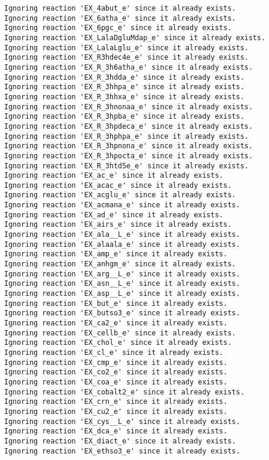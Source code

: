 \documentclass[
  letterpaper,
  DIV=11,
  numbers=noendperiod]{scrartcl}
\begin{document}
\begin{verbatim}
Ignoring reaction 'EX_4abut_e' since it already exists.
Ignoring reaction 'EX_6atha_e' since it already exists.
Ignoring reaction 'EX_6pgc_e' since it already exists.
Ignoring reaction 'EX_LalaDgluMdap_e' since it already exists.
Ignoring reaction 'EX_LalaLglu_e' since it already exists.
Ignoring reaction 'EX_R3hdec4e_e' since it already exists.
Ignoring reaction 'EX_R_3h6atha_e' since it already exists.
Ignoring reaction 'EX_R_3hdda_e' since it already exists.
Ignoring reaction 'EX_R_3hhpa_e' since it already exists.
Ignoring reaction 'EX_R_3hhxa_e' since it already exists.
Ignoring reaction 'EX_R_3hnonaa_e' since it already exists.
Ignoring reaction 'EX_R_3hpba_e' since it already exists.
Ignoring reaction 'EX_R_3hpdeca_e' since it already exists.
Ignoring reaction 'EX_R_3hphpa_e' since it already exists.
Ignoring reaction 'EX_R_3hpnona_e' since it already exists.
Ignoring reaction 'EX_R_3hpocta_e' since it already exists.
Ignoring reaction 'EX_R_3htd5e_e' since it already exists.
Ignoring reaction 'EX_ac_e' since it already exists.
Ignoring reaction 'EX_acac_e' since it already exists.
Ignoring reaction 'EX_acglu_e' since it already exists.
Ignoring reaction 'EX_acmana_e' since it already exists.
Ignoring reaction 'EX_ad_e' since it already exists.
Ignoring reaction 'EX_airs_e' since it already exists.
Ignoring reaction 'EX_ala__L_e' since it already exists.
Ignoring reaction 'EX_alaala_e' since it already exists.
Ignoring reaction 'EX_amp_e' since it already exists.
Ignoring reaction 'EX_anhgm_e' since it already exists.
Ignoring reaction 'EX_arg__L_e' since it already exists.
Ignoring reaction 'EX_asn__L_e' since it already exists.
Ignoring reaction 'EX_asp__L_e' since it already exists.
Ignoring reaction 'EX_but_e' since it already exists.
Ignoring reaction 'EX_butso3_e' since it already exists.
Ignoring reaction 'EX_ca2_e' since it already exists.
Ignoring reaction 'EX_cellb_e' since it already exists.
Ignoring reaction 'EX_chol_e' since it already exists.
Ignoring reaction 'EX_cl_e' since it already exists.
Ignoring reaction 'EX_cmp_e' since it already exists.
Ignoring reaction 'EX_co2_e' since it already exists.
Ignoring reaction 'EX_coa_e' since it already exists.
Ignoring reaction 'EX_cobalt2_e' since it already exists.
Ignoring reaction 'EX_crn_e' since it already exists.
Ignoring reaction 'EX_cu2_e' since it already exists.
Ignoring reaction 'EX_cys__L_e' since it already exists.
Ignoring reaction 'EX_dca_e' since it already exists.
Ignoring reaction 'EX_diact_e' since it already exists.
Ignoring reaction 'EX_ethso3_e' since it already exists.

\end{verbatim}
\end{document}
